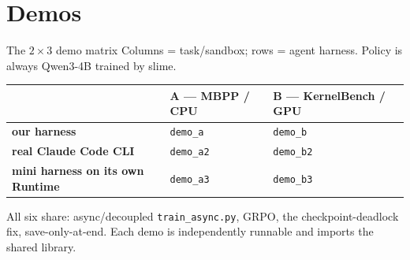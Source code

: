 \documentclass[aspectratio=169]{beamer}
\begin{document}
\section{Demos}


\begin{frame}{The $2\times3$ demo matrix}
  Columns = task/sandbox; rows = agent harness. Policy is always Qwen3-4B trained by slime.
  \vspace{0.3em}
  \begin{table}\centering
    \renewcommand{\arraystretch}{1.3}\small
    \begin{tabular}{lll}
      \toprule
       & \textbf{A --- MBPP / CPU} & \textbf{B --- KernelBench / GPU} \\
      \midrule
      \textbf{our harness}          & \texttt{demo\_a}  & \texttt{demo\_b} \\
      \textbf{real Claude Code CLI}\footnotemark & \texttt{demo\_a2} & \texttt{demo\_b2} \\
      \textbf{mini harness on its own Runtime} & \texttt{demo\_a3} & \texttt{demo\_b3} \\
      \bottomrule
    \end{tabular}
  \end{table}
  \vspace{0.2em}
  \footnotesize All six share: async/decoupled \texttt{train\_async.py}, GRPO, the
  checkpoint-deadlock fix, save-only-at-end. Each demo is independently runnable and imports the
  shared library.
\end{frame}
\end{document}
